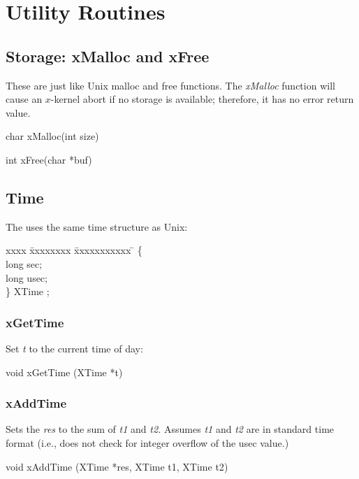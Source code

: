\section{Utility Routines}

\subsection{Storage: xMalloc and xFree}

These are just like Unix malloc and free functions.  The {\em xMalloc}
function will cause an $x$-kernel abort if no storage is available;
therefore, it has no error return value.
\medskip

{\sem char} {\bold *xMalloc}({\sem int} {\caps size})\\
\medskip

{\sem int} {\bold xFree}({\sem char} *{\caps buf})

\subsection{Time}

The \xk{} uses the same time structure as Unix:

\begin{tabbing}
xxxx \= xxxxxxxx \= xxxxxxxxxxx \= \kill
{} \{\\
\>\>  {\sem long}  sec;\\
\>\>  {\sem long}  usec;\\
\>\} {\bold XTime} ;\\
\end{tabbing}


\subsubsection{xGetTime}

Set {\em *t} to the current time of day:
\medskip

{\sem void} {\bold xGetTime} ({\sem XTime} *{\caps t})


\subsubsection{xAddTime}

Sets the {\em res} to the sum of {\em t1} and {\em t2.}
Assumes {\em t1} and {\em t2} are in standard time format (i.e., does not
check for integer overflow of the usec value.)
\medskip

{\sem void} {\bold xAddTime} 
({\sem XTime} *{\caps res}, {\sem XTime} {\caps t1}, {\sem XTime} {\caps t2})


